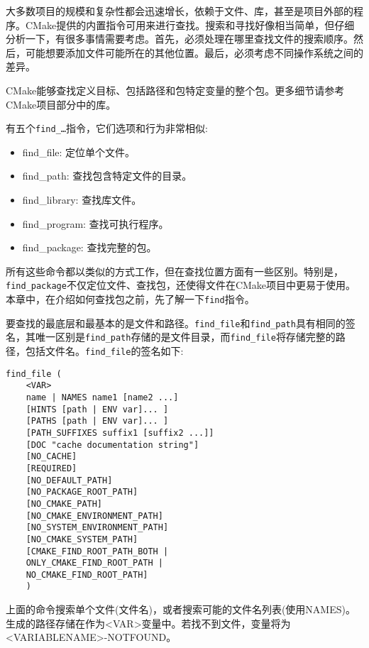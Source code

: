 
大多数项目的规模和复杂性都会迅速增长，依赖于文件、库，甚至是项目外部的程序。CMake提供的内置指令可用来进行查找。搜索和寻找好像相当简单，但仔细分析一下，有很多事情需要考虑。首先，必须处理在哪里查找文件的搜索顺序。然后，可能想要添加文件可能所在的其他位置。最后，必须考虑不同操作系统之间的差异。

CMake能够查找定义目标、包括路径和包特定变量的整个包。更多细节请参考CMake项目部分中的库。

有五个\texttt{find\_…}指令，它们选项和行为非常相似:

\begin{itemize}
\item 
find\_file: 定位单个文件。

\item 
find\_path: 查找包含特定文件的目录。

\item 
find\_library: 查找库文件。

\item 
find\_program: 查找可执行程序。

\item 
find\_package: 查找完整的包。
\end{itemize}

所有这些命令都以类似的方式工作，但在查找位置方面有一些区别。特别是，\texttt{find\_package}不仅定位文件、查找包，还使得文件在CMake项目中更易于使用。本章中，在介绍如何查找包之前，先了解一下\texttt{find}指令。


要查找的最底层和最基本的是文件和路径。\texttt{find\_file}和\texttt{find\_path}具有相同的签名，其唯一区别是\texttt{find\_path}存储的是文件目录，而\texttt{find\_file}将存储完整的路径，包括文件名。\texttt{find\_file}的签名如下:

\begin{lstlisting}[style=styleCMake]
find_file (
	<VAR>
	name | NAMES name1 [name2 ...]
	[HINTS [path | ENV var]... ]
	[PATHS [path | ENV var]... ]
	[PATH_SUFFIXES suffix1 [suffix2 ...]]
	[DOC "cache documentation string"]
	[NO_CACHE]
	[REQUIRED]
	[NO_DEFAULT_PATH]
	[NO_PACKAGE_ROOT_PATH]
	[NO_CMAKE_PATH]
	[NO_CMAKE_ENVIRONMENT_PATH]
	[NO_SYSTEM_ENVIRONMENT_PATH]
	[NO_CMAKE_SYSTEM_PATH]
	[CMAKE_FIND_ROOT_PATH_BOTH |
	ONLY_CMAKE_FIND_ROOT_PATH |
	NO_CMAKE_FIND_ROOT_PATH]
	)
\end{lstlisting}

上面的命令搜索单个文件(文件名)，或者搜索可能的文件名列表(使用NAMES)。生成的路径存储在作为<VAR>变量中。若找不到文件，变量将为<VARIABLENAME>-NOTFOUND。

